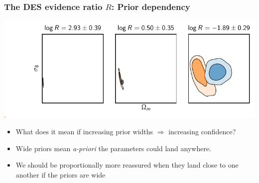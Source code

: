 \documentclass[aspectratio=169]{beamer}
\begin{document}
\begin{frame}
    \frametitle{The DES evidence ratio $R$: Prior dependency}
    {\includegraphics[trim=0.6in 0.3in 0in 0in]{./plots/prior_dependency.pdf}}
    \begin{itemize}
        \item What does it mean if increasing prior widths $\Rightarrow$ increasing confidence? 
        \item Wide priors mean {\em a-priori\/} the parameters could land anywhere.
        \item We should be proportionally more reassured when they land close to one another if the priors are wide
    \end{itemize}
\end{frame}
\end{document}
